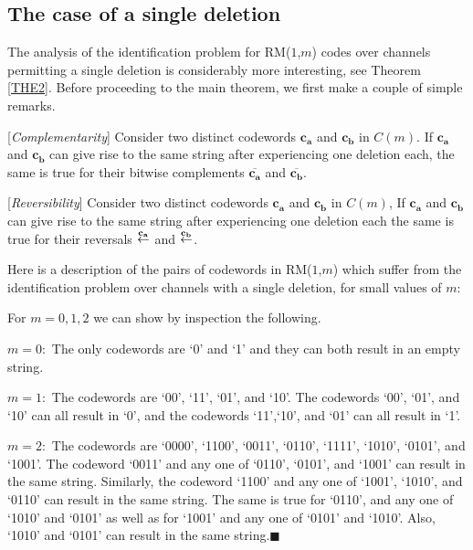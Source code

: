 \subsection{The case of a single deletion}

The analysis of the identification problem for RM($1$,$m$) codes
over channels permitting a single deletion is considerably more
interesting, see Theorem \ref{THE2}. Before proceeding to the main
theorem, we first make a couple of simple remarks.

\begin{remark}\label{Re31}
[\textit{Complementarity}] Consider two distinct codewords
$\mathbf{c_a}$ and $\mathbf{c_b}$ in $C(m)$. If $\mathbf{c_a}$ and
$\mathbf{c_b}$ can give rise to the same string after experiencing
one deletion each, the same is true for their bitwise complements
$\overline{\mathbf{c_a}}$ and $\overline{\mathbf{c_b}}$.
\end{remark}

\begin{remark}\label{Re32}
[\textit{Reversibility}] Consider two distinct codewords
$\mathbf{c_a}$ and $\mathbf{c_b}$ in $C(m)$, If $\mathbf{c_a}$ and
$\mathbf{c_b}$ can give rise to the same string after experiencing
one deletion each the same is true for their reversals ${\revca}$
and ${\revcb}$.
\end{remark}

Here is a description of the pairs of codewords in RM($1$,$m$)
which suffer from the identification problem over channels with a
single deletion, for small values of $m$:

\begin{remark}\label{re:RE2}
For $m=0,1,2$ we can show by inspection the following.

$m=0:$ The only codewords are `0' and `1' and they can both result
in an empty string.

$m=1:$ The codewords are `00', `11', `01', and `10'. The codewords
`00', `01', and `10' can all result in `0', and the codewords
`11',`10', and `01' can all result in `1'.

$m=2:$ The codewords are `0000', `1100', `0011', `0110', `1111',
`1010', `0101', and `1001'. The codeword `0011' and any one of
`0110', `0101', and `1001' can result in the same string.
Similarly, the codeword `1100' and any one of `1001', `1010', and
`0110' can result in the same string. The same is true for `0110',
and any one of `1010' and `0101' as well as for `1001' and any one
of `0101' and `1010'. Also, `1010' and `0101' can result in the
same string.\hfill $\blacksquare$
\end{remark}

